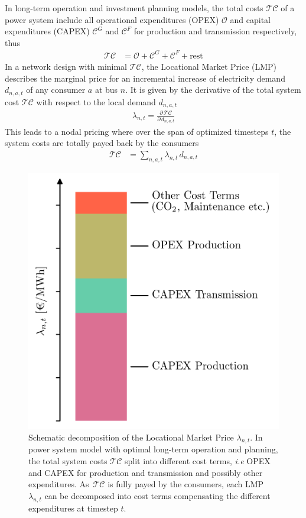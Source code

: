 \documentclass[11pt,twocolumn]{article}
\newcommand{\demand}[1][n]{d_{#1,a,t}}
\newcommand{\lmp}[1][n]{\lambda_{#1,t}}
\newcommand{\totalcost}{\mathcal{TC}}
\newcommand{\totalOpexGeneration}{\mathcal{O}}
\newcommand{\totalCapexGeneration}{\mathcal{C}^G}
\newcommand{\totalCapexFlow}{\mathcal{C}^F}
\newcommand{\pdv}[2]{\frac{\partial #1}{\partial #2}}
\begin{document}
In long-term operation and investment planning models, the total costs $\totalcost$ of a power system include all operational expenditures (OPEX) $\totalOpexGeneration$ and capital expenditures (CAPEX) $\totalCapexGeneration$ and $\totalCapexFlow$ for production  and transmission respectively, thus
\begin{align}
  \totalcost &= \totalOpexGeneration + \totalCapexGeneration +  \totalCapexFlow + \text{rest}
  \label{eq:total_cost_terms}
\end{align}
In a network design with minimal $\totalcost$, the Locational Market Price (LMP) describes the marginal price for an incremental increase of electricity demand $\demand$ of any consumer $a$ at bus $n$. It is given by the derivative of the total system cost $\totalcost$ with respect to the local demand $\demand$
\begin{align}
 \lmp = \pdv{\,\totalcost}{\,\demand}
 \label{eq:total_cost_derivative}
\end{align}
This leads to a nodal pricing where over the span of optimized timesteps $t$, the system costs are totally payed back by the consumers 
\begin{align}
 \totalcost &=  \sum_{n,a,t} \lmp \, \demand
 \label{eq:total_cost_sum}
\end{align}
% 
\begin{figure}[h]
\centering
 \includegraphics[width=.8\linewidth]{price_decomposition.png}
 \caption{Schematic decomposition of the Locational Market Price $\lmp$. In power system model with optimal long-term operation and planning, the total system costs $\totalcost$ split into different cost terms, \textit{i.e} OPEX and CAPEX for production and transmission and possibly other expenditures. As $\,\totalcost$ is fully payed by the consumers, each LMP $\lmp$ can be decomposed into cost terms compensating the different expenditures at timestep $t$.}
 \label{fig:price_decomposition}
\end{figure}
\end{document}
